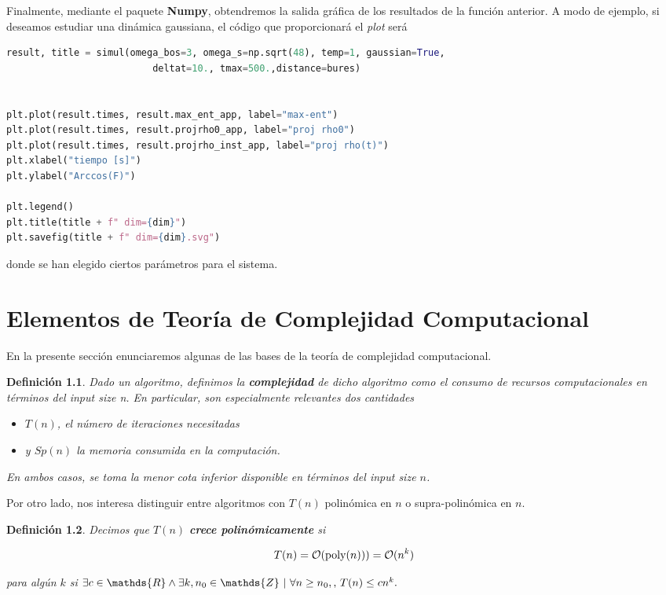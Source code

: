 \documentclass{report} %
\newtheorem{definition}{Definición}[section]
\numberwithin{equation}{section}
\begin{document}
Finalmente, mediante el paquete \textbf{Numpy}, obtendremos la salida gráfica de los resultados de la función anterior. A modo de ejemplo, si deseamos estudiar una dinámica gaussiana, el código que proporcionará el \textit{plot} será 

\begin{lstlisting}[language=Python]
    result, title = simul(omega_bos=3, omega_s=np.sqrt(48), temp=1, gaussian=True,
                          deltat=10., tmax=500.,distance=bures)


plt.plot(result.times, result.max_ent_app, label="max-ent")
plt.plot(result.times, result.projrho0_app, label="proj rho0")
plt.plot(result.times, result.projrho_inst_app, label="proj rho(t)")
plt.xlabel("tiempo [s]")
plt.ylabel("Arccos(F)")

plt.legend()
plt.title(title + f" dim={dim}")
plt.savefig(title + f" dim={dim}.svg")
\end{lstlisting}

donde se han elegido ciertos parámetros para el sistema. 

\chapter{Elementos de Teor\'ia de Complejidad Computacional}
\label{Appendix D}

En la presente sección enunciaremos algunas de las bases de la teoría de complejidad computacional.

\begin{definition}
Dado un algoritmo, definimos la \textbf{complejidad} de dicho algoritmo como el consumo de recursos computacionales en términos del \textit{input size n}. En particular, son especialmente relevantes dos cantidades

\begin{itemize}
    \item $T(n)$, el número de iteraciones necesitadas 
    \item y $Sp(n)$ la memoria consumida en la computación.
\end{itemize}

En ambos casos, se toma la menor cota inferior disponible en términos del input size $n$.
\end{definition}

Por otro lado, nos interesa distinguir entre algoritmos con $T(n)$ polinómica en $n$ o supra-polinómica en $n$.

\begin{definition}
Decimos que $T(n)$ \textbf{crece polinómicamente} si 

$$
T(n) = \mathcal{O}(\textnormal{poly}(n))) = \mathcal{O}(n^k)
$$

para algún $k$ si $\exists c \in \mathds{R} \land \exists k, n_0 \in \mathds{Z} \textnormal{ | } \forall n \geq n_0, \textnormal{, } T(n) \leq cn^{k}.$
\end{definition}
\end{document}
